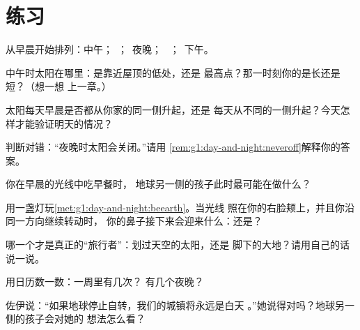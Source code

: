 \section{练习}

\begin{exercise}[$\star$]\label{exo:g1:day-and-night:1}
从早晨开始排列：中午；\ ；\ 夜晚；
\ ；\ 下午。
\end{exercise}

\begin{exercise}[$\star$]\label{exo:g1:day-and-night:2}
中午时太阳在哪里：是靠近屋顶的低处，还是
最高点？那一时刻你的是长还是短？（想一想
上一章。）
\end{exercise}

\begin{exercise}[$\star$]\label{exo:g1:day-and-night:3}
太阳每天早晨是否都从你家的同一侧升起，还是
每天从不同的一侧升起？今天怎样才能验证明天的情况？
\end{exercise}

\begin{exercise}[$\star$]\label{exo:g1:day-and-night:4}
判断对错：“夜晚时太阳会关闭。”请用
\cref{rem:g1:day-and-night:neveroff}解释你的答案。
\end{exercise}

\begin{exercise}[$\star$]\label{exo:g1:day-and-night:5}
你在早晨的光线中吃早餐时，
地球另一侧的孩子此时最可能在做什么？
\end{exercise}

\begin{exercise}[$\star$]\label{exo:g1:day-and-night:6}
用一盏灯玩\cref{met:g1:day-and-night:beearth}。当光线
照在你的右脸颊上，并且你沿同一方向继续转动时，
你的鼻子接下来会迎来什么：还是？
\end{exercise}

\begin{exercise}[$\star$]\label{exo:g1:day-and-night:7}
哪一个才是真正的“旅行者”：划过天空的太阳，还是
脚下的大地？请用自己的话说一说。
\end{exercise}

\begin{exercise}[$\star$]\label{exo:g1:day-and-night:8}
用日历数一数：一周里有几次？
有几个夜晚？
\end{exercise}

\begin{exercise}[$\star\star$]\label{exo:g1:day-and-night:9}
佐伊说：“如果地球停止自转，我们的城镇将永远是白天
。”她说得对吗？地球另一侧的孩子会对她的
想法怎么看？
\end{exercise}
